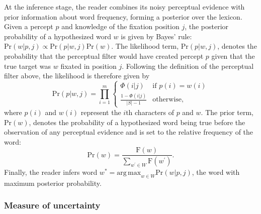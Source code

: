 \documentclass[doc,biblatex,floatsintext]{apa7}
\begin{document}
At the inference stage, the reader combines its noisy perceptual evidence with prior information about word frequency, forming a posterior over the lexicon. Given a percept $p$ and knowledge of the fixation position $j$, the posterior probability of a hypothesized word $w$ is given by Bayes' rule: $\mathrm{Pr}(w|p,j) \propto \mathrm{Pr}(p|w,j) \mathrm{Pr}(w)$. The likelihood term, $\mathrm{Pr}(p|w,j)$, denotes the probability that the perceptual filter would have created percept $p$ given that the true target was $w$ fixated in position $j$. Following the definition of the perceptual filter above, the likelihood is therefore given by
\begin{equation}
\mathrm{Pr}(p|w,j) = \prod_{i=1}^m
\begin{cases}
       \Phi(i|j)                   & \text{if $p(i) = w(i)$} \\
       \frac{1 - \Phi(i|j)}{|S|-1} & \text{otherwise,}
\end{cases}
\label{likelihood}
\end{equation}
where $p(i)$ and $w(i)$ represent the $i$th characters of $p$ and $w$. The prior term, $\mathrm{Pr}(w)$, denotes the probability of a hypothesized word being true before the observation of any perceptual evidence and is set to the relative frequency of the word:
\begin{equation}
\mathrm{Pr}(w) = \frac{\mathrm{F}(w)}{\sum_{w^\prime \in W} \mathrm{F}(w^\prime)}.
\label{prior}
\end{equation}
Finally, the reader infers word $w^\ast = \mathrm{arg\,max}_{w \in W} \mathrm{Pr}(w|p,j)$, the word with maximum posterior probability.

\subsubsection{Measure of uncertainty}
\end{document}

